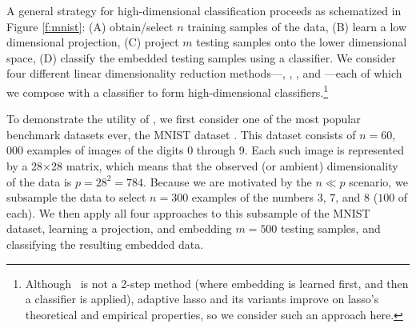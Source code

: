 \documentclass[10pt]{article}
\begin{document}
A general strategy for high-dimensional classification proceeds as  schematized in Figure \ref{f:mnist}:
(A) obtain/select $n$ training samples of the data,
(B) learn a low dimensional projection,
(C) project $m$ testing samples onto the lower dimensional space,
(D) classify the embedded testing samples using a classifier.
We consider  four different linear dimensionality reduction methods---, \Lda, \Pca, and \Lol---each of which we compose with a classifier to form high-dimensional classifiers.\footnote{Although ~is not a 2-step method (where embedding is learned first, and then a classifier is applied), adaptive lasso \cite{Zou2006a} and its variants improve on lasso's theoretical and empirical properties, so we consider such an approach here.}

To demonstrate the utility of \Lol, we  first consider one of the most popular benchmark datasets ever, the MNIST dataset \cite{mnist}.  This dataset consists of $n=60$,$000$ examples of images of the digits 0 through 9.  Each such image is represented by a 28$\times$28 matrix, which means that the observed (or ambient) dimensionality of the data is $p=28^2=784$.  Because we are motivated by the $n \ll p$ scenario, we subsample the data to select $n=300$ examples of the numbers $3$, $7$, and $8$ ($100$ of each). We then apply all four approaches to this subsample of the MNIST dataset, learning a projection, and embedding $m=500$ testing samples, and classifying the resulting embedded data.

\end{document}
